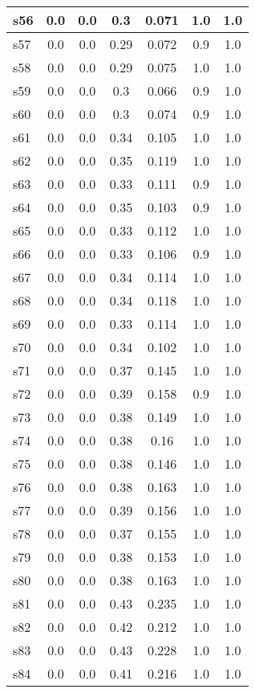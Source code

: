 \documentclass{article}
\begin{document}
\begin{tabular}{|l|c|c|c|c|c|c|}
\hline
s56 &0.0 & 0.0 & 0.3 & 0.071 & 1.0 & 1.0\\
\hline
s57 &0.0 & 0.0 & 0.29 & 0.072 & 0.9 & 1.0\\
\hline
s58 &0.0 & 0.0 & 0.29 & 0.075 & 1.0 & 1.0\\
\hline
s59 &0.0 & 0.0 & 0.3 & 0.066 & 0.9 & 1.0\\
\hline
s60 &0.0 & 0.0 & 0.3 & 0.074 & 0.9 & 1.0\\
\hline
s61 &0.0 & 0.0 & 0.34 & 0.105 & 1.0 & 1.0\\
\hline
s62 &0.0 & 0.0 & 0.35 & 0.119 & 1.0 & 1.0\\
\hline
s63 &0.0 & 0.0 & 0.33 & 0.111 & 0.9 & 1.0\\
\hline
s64 &0.0 & 0.0 & 0.35 & 0.103 & 0.9 & 1.0\\
\hline
s65 &0.0 & 0.0 & 0.33 & 0.112 & 1.0 & 1.0\\
\hline
s66 &0.0 & 0.0 & 0.33 & 0.106 & 0.9 & 1.0\\
\hline
s67 &0.0 & 0.0 & 0.34 & 0.114 & 1.0 & 1.0\\
\hline
s68 &0.0 & 0.0 & 0.34 & 0.118 & 1.0 & 1.0\\
\hline
s69 &0.0 & 0.0 & 0.33 & 0.114 & 1.0 & 1.0\\
\hline
s70 &0.0 & 0.0 & 0.34 & 0.102 & 1.0 & 1.0\\
\hline
s71 &0.0 & 0.0 & 0.37 & 0.145 & 1.0 & 1.0\\
\hline
s72 &0.0 & 0.0 & 0.39 & 0.158 & 0.9 & 1.0\\
\hline
s73 &0.0 & 0.0 & 0.38 & 0.149 & 1.0 & 1.0\\
\hline
s74 &0.0 & 0.0 & 0.38 & 0.16 & 1.0 & 1.0\\
\hline
s75 &0.0 & 0.0 & 0.38 & 0.146 & 1.0 & 1.0\\
\hline
s76 &0.0 & 0.0 & 0.38 & 0.163 & 1.0 & 1.0\\
\hline
s77 &0.0 & 0.0 & 0.39 & 0.156 & 1.0 & 1.0\\
\hline
s78 &0.0 & 0.0 & 0.37 & 0.155 & 1.0 & 1.0\\
\hline
s79 &0.0 & 0.0 & 0.38 & 0.153 & 1.0 & 1.0\\
\hline
s80 &0.0 & 0.0 & 0.38 & 0.163 & 1.0 & 1.0\\
\hline
s81 &0.0 & 0.0 & 0.43 & 0.235 & 1.0 & 1.0\\
\hline
s82 &0.0 & 0.0 & 0.42 & 0.212 & 1.0 & 1.0\\
\hline
s83 &0.0 & 0.0 & 0.43 & 0.228 & 1.0 & 1.0\\
\hline
s84 &0.0 & 0.0 & 0.41 & 0.216 & 1.0 & 1.0\\

\end{tabular}
\end{document}
